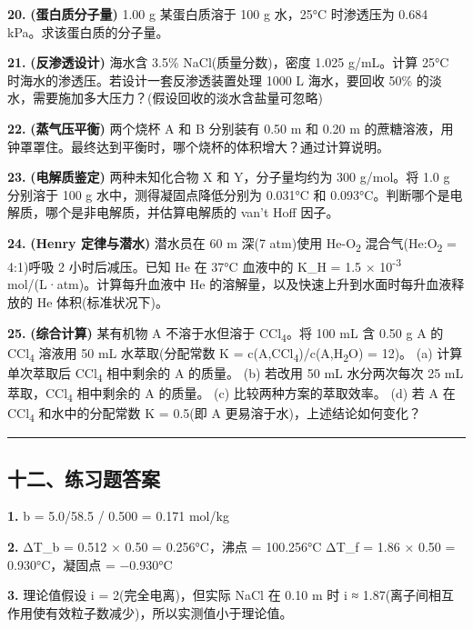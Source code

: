 \textbf{20.} \textbf{(蛋白质分子量)} 1.00 g 某蛋白质溶于 100 g 水，25°C 时渗透压为 0.684 kPa。求该蛋白质的分子量。

\textbf{21.} \textbf{(反渗透设计)} 海水含 3.5\% NaCl(质量分数)，密度 1.025 g/mL。计算 25°C 时海水的渗透压。若设计一套反渗透装置处理 1000 L 海水，要回收 50\% 的淡水，需要施加多大压力？(假设回收的淡水含盐量可忽略)

\textbf{22.} \textbf{(蒸气压平衡)} 两个烧杯 A 和 B 分别装有 0.50 m 和 0.20 m 的蔗糖溶液，用钟罩罩住。最终达到平衡时，哪个烧杯的体积增大？通过计算说明。

\textbf{23.} \textbf{(电解质鉴定)} 两种未知化合物 X 和 Y，分子量均约为 300 g/mol。将 1.0 g 分别溶于 100 g 水中，测得凝固点降低分别为 0.031°C 和 0.093°C。判断哪个是电解质，哪个是非电解质，并估算电解质的 van't Hoff 因子。

\textbf{24.} \textbf{(Henry 定律与潜水)} 潜水员在 60 m 深(7 atm)使用 He-O\textsubscript{2} 混合气(He:O\textsubscript{2} = 4:1)呼吸 2 小时后减压。已知 He 在 37°C 血液中的 K\_H = 1.5 × 10\textsuperscript{-3} mol/(L·atm)。计算每升血液中 He 的溶解量，以及快速上升到水面时每升血液释放的 He 体积(标准状况下)。

\textbf{25.} \textbf{(综合计算)} 某有机物 A 不溶于水但溶于 CCl\textsubscript{4}。将 100 mL 含 0.50 g A 的 CCl\textsubscript{4} 溶液用 50 mL 水萃取(分配常数 K = c(A,CCl\textsubscript{4})/c(A,H\textsubscript{2}O) = 12)。
(a) 计算单次萃取后 CCl\textsubscript{4} 相中剩余的 A 的质量。
(b) 若改用 50 mL 水分两次每次 25 mL 萃取，CCl\textsubscript{4} 相中剩余的 A 的质量。
(c) 比较两种方案的萃取效率。
(d) 若 A 在 CCl\textsubscript{4} 和水中的分配常数 K = 0.5(即 A 更易溶于水)，上述结论如何变化？

\begin{center}\rule{0.5\linewidth}{0.5pt}\end{center}

\subsection{十二、练习题答案}\label{ux5341ux4e8cux7ec3ux4e60ux9898ux7b54ux6848}

\textbf{1.} b = 5.0/58.5 / 0.500 = 0.171 mol/kg

\textbf{2.} ΔT\_b = 0.512 × 0.50 = 0.256°C，沸点 = 100.256°C
ΔT\_f = 1.86 × 0.50 = 0.930°C，凝固点 = −0.930°C

\textbf{3.} 理论值假设 i = 2(完全电离)，但实际 NaCl 在 0.10 m 时 i ≈ 1.87(离子间相互作用使有效粒子数减少)，所以实测值小于理论值。

